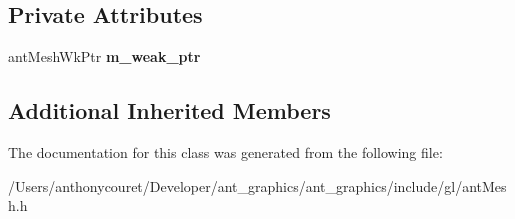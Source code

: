 \subsection*{Private Attributes}
\begin{DoxyCompactItemize}
\item 
\hypertarget{classant_mesh_aca39a8e65075996cb466d3378baf821b}{ant\+Mesh\+Wk\+Ptr {\bfseries m\+\_\+weak\+\_\+ptr}}\label{classant_mesh_aca39a8e65075996cb466d3378baf821b}

\end{DoxyCompactItemize}
\subsection*{Additional Inherited Members}


The documentation for this class was generated from the following file\+:\begin{DoxyCompactItemize}
\item 
/\+Users/anthonycouret/\+Developer/ant\+\_\+graphics/ant\+\_\+graphics/include/gl/ant\+Mesh.\+h\end{DoxyCompactItemize}
